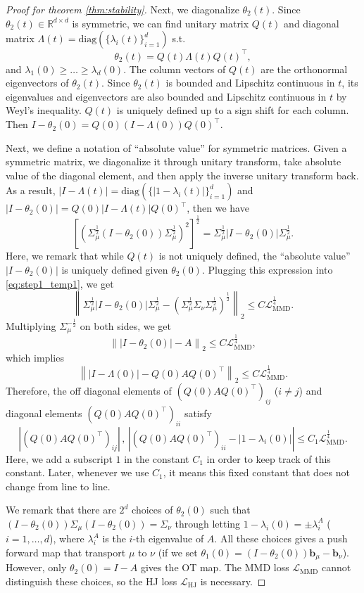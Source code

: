 \documentclass{article} %
\theoremstyle{plain}
\theoremstyle{definition}
\theoremstyle{remark}
\newcommand{\R}{\mathbb{R}}
\newcommand{\norm}[2][H^s]{\left\|#2\right\|_{#1}}
\newcommand{\bb}{\mathbf{b}}
\newcommand{\LMMD}{\mathcal{L}_{\text{MMD}}}
\newcommand{\LHJ}{\mathcal{L}_{\text{HJ}}}
\newcommand{\lam}{\lambda}
\newcommand{\Lam}{\Lambda}
\newcommand{\diag}{\mathrm{diag}}
\newcommand{\tp}{^{\top}}
\newcommand{\parentheses}[1]{\left(#1\right)}
\newcommand{\sqbra}[1]{\left[#1\right]}
\newcommand{\abs}[1]{\left|#1\right|}
\begin{document}
\begin{proof}[Proof for theorem \ref{thm:stability}]
Next, we diagonalize $\theta_2(t)$. Since $\theta_2(t) \in \R^{d\times d}$ is symmetric, we can find unitary matrix $Q(t)$ and diagonal matrix $\Lam(t) = \diag(\{\lam_i(t)\}_{i=1}^d)$ s.t.
$$\theta_2(t) = Q(t) \Lam(t) Q(t)\tp,$$
and $\lam_1(0) \ge \ldots \ge \lam_d(0)$. The column vectors of $Q(t)$ are the orthonormal eigenvectors of $\theta_2(t)$. Since $\theta_2(t)$ is bounded and Lipschitz continuous in $t$, its eigenvalues and eigenvectors are also bounded and Lipschitz continuous in $t$ by  Weyl's inequality. $Q(t)$ is uniquely defined up to a sign shift for each column. Then $I-\theta_2(0) = Q(0)(I - \Lam(0))Q(0)\tp$.

Next, we define a notation of ``absolute value'' for symmetric matrices. Given a symmetric matrix, we diagonalize it through unitary transform, take absolute value of the diagonal element, and then apply the inverse unitary transform back. As a result, $\abs{I-\Lam(t)} = \diag(\{|1-\lam_i(t)|\}_{i=1}^d)$ and $\abs{I-\theta_2(0)} = Q(0)\abs{I-\Lam(t)}Q(0)\tp$, then we have
$$\sqbra{\parentheses{\Sigma_\mu^{\frac12}(I-\theta_2(0))\Sigma_\mu^{\frac12}}^2}^{\frac12} = \Sigma_\mu^{\frac12}\abs{I-\theta_2(0)}\Sigma_\mu^{\frac12}.$$
Here, we remark that while $Q(t)$ is not uniquely defined, the ``absolute value'' $\abs{I-\theta_2(0)}$ is uniquely defined given $\theta_2(0)$. Plugging this expression into \eqref{eq:step1_temp1}, we get
$$\norm[2]{\Sigma_\mu^{\frac12}\abs{I-\theta_2(0)}\Sigma_\mu^{\frac12} - \parentheses{\Sigma_\mu^{\frac12} \Sigma_\nu \Sigma_\mu^{\frac12}}^{\frac12}} \le C \LMMD^{\frac14}.$$
Multiplying $\Sigma_\mu^{-\frac12}$ on both sides, we get
\begin{equation}\label{eq:step1_result1}
\norm[2]{\abs{I-\theta_2(0)} - A} \le C \LMMD^{\frac14},
\end{equation}
which implies
\begin{equation}\label{eq:step1_result2}
\norm[2]{\abs{I-\Lam(0)} - Q(0)AQ(0)\tp} \le C \LMMD^{\frac14}.
\end{equation}
Therefore, the off diagonal elements of $ (Q(0)AQ(0)\tp)_{ij}$ ($i \neq j$) and diagonal elements $ (Q(0)AQ(0)\tp)_{ii}$ satisfy
$$\abs{(Q(0)AQ(0)\tp)_{ij}} \,,\, \abs{ (Q(0)AQ(0)\tp)_{ii} - |1 - \lam_i(0)|} \le C_1 \LMMD^{\frac14}.$$
Here, we add a subscript $1$ in the constant $C_1$ in order to keep track of this constant. Later, whenever we use $C_1$, it means this fixed constant that does not change from line to line.

We remark that there are $2^d$ choices of $\theta_2(0)$ such that $(I-\theta_2(0)) \Sigma_\mu (I-\theta_2(0)) = \Sigma_\nu$ through letting $1-\lam_i(0)=\pm \lam^A_i$ ($i=1,\ldots,d$), where $\lam^A_i$ is the $i$-th eigenvalue of $A$. All these choices gives a push forward map that transport $\mu$ to $\nu$ (if we set $\theta_1(0) = (I-\theta_2(0))\bb_\mu - \bb_\nu$).
However, only $\theta_2(0) = I-A$ gives the OT map. The MMD loss $\LMMD$ cannot distinguish these choices, so the HJ loss $\LHJ$ is necessary.


\end{proof}
\end{document}
